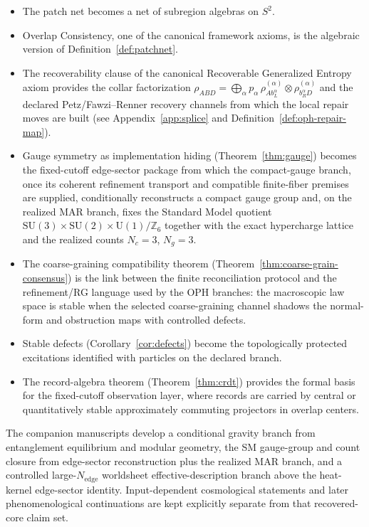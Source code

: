 \documentclass[11pt]{article}
\theoremstyle{remark}
\theoremstyle{plain}
\begin{document}
\begin{itemize}
\item The patch net becomes a net of subregion algebras on $S^2$.
\item Overlap Consistency, one of the canonical framework axioms, is the algebraic version of Definition~\ref{def:patchnet}.
\item The recoverability clause of the canonical Recoverable Generalized Entropy axiom provides the collar factorization $\rho_{ABD} = \bigoplus_\alpha p_\alpha\,\rho^{(\alpha)}_{Ab_L^\alpha}\otimes\rho^{(\alpha)}_{b_R^\alpha D}$ and the declared Petz/Fawzi--Renner recovery channels from which the local repair moves are built (see Appendix~\ref{app:splice} and Definition~\ref{def:oph-repair-map}).
\item Gauge symmetry as implementation hiding (Theorem~\ref{thm:gauge}) becomes the fixed-cutoff edge-sector package from which the compact-gauge branch, once its coherent refinement transport and compatible finite-fiber premises are supplied, conditionally reconstructs a compact gauge group and, on the realized MAR branch, fixes the Standard Model quotient $\mathrm{SU}(3)\times\mathrm{SU}(2)\times\mathrm{U}(1)/\mathbb{Z}_6$ together with the exact hypercharge lattice and the realized counts \(N_c=3\), \(N_g=3\).
\item The coarse-graining compatibility theorem (Theorem~\ref{thm:coarse-grain-consensus}) is the link between the finite reconciliation protocol and the refinement/RG language used by the OPH branches: the macroscopic law space is stable when the selected coarse-graining channel shadows the normal-form and obstruction maps with controlled defects.
\item Stable defects (Corollary~\ref{cor:defects}) become the topologically protected excitations identified with particles on the declared branch.
\item The record-algebra theorem (Theorem~\ref{thm:crdt}) provides the formal basis for the fixed-cutoff observation layer, where records are carried by central or quantitatively stable approximately commuting projectors in overlap centers.
\end{itemize}

The companion manuscripts develop a conditional gravity branch from entanglement equilibrium and modular geometry, the SM gauge-group and count closure from edge-sector reconstruction plus the realized MAR branch, and a controlled large-\(N_{\mathrm{edge}}\) worldsheet effective-description branch above the heat-kernel edge-sector identity. Input-dependent cosmological statements and later phenomenological continuations are kept explicitly separate from that recovered-core claim set.
\end{document}
